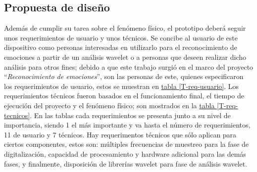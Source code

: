 \documentclass[11pt,lettersize]{article} %
\newcommand{\tabla}[1]{\hyperref[{#1}]{tabla \ref*{#1}}}
\begin{document}




\subsection{Propuesta de diseño}
\label{S-prop-dise}
Además de cumplir su tarea sobre el fenómeno físico, el prototipo deberá seguir unos requerimientos de usuario y unos técnicos. Se concibe al usuario de este dispositivo como personas interesadas en utilizarlo para el reconocimiento de emociones a partir de un análisis wavelet o a personas que deseen realizar dicho análisis para otros fines; debido a que este trabajo surgió en el marco del proyecto ``\emph{Reconocimiento de emociones}'', son las personas de este, quienes especificaron los requerimientos de usuario, estos se muestran en \tabla{T-req-usuario}. Los requerimientos técnicos fueron basados en el funcionamiento final, el tiempo de ejecución del proyecto y el fenómeno físico; son mostrados en la \tabla{T-req-tecnicos}. En las tablas cada requerimientos se presenta junto a su nivel de importancia, siendo 1 el más importante y va hasta el número de requerimientos, 11 de usuario y 7 técnicos. Hay requerimentos técnicos que sólo aplican para ciertos componentes, estos son: múltiples frecuencias de muestreo para la fase de digitalización, capacidad de procesamiento y hardware adicional para las demás fases, y finalmente, disposición de librerías wavelet para fase de análisis wavelet.
\end{document}
